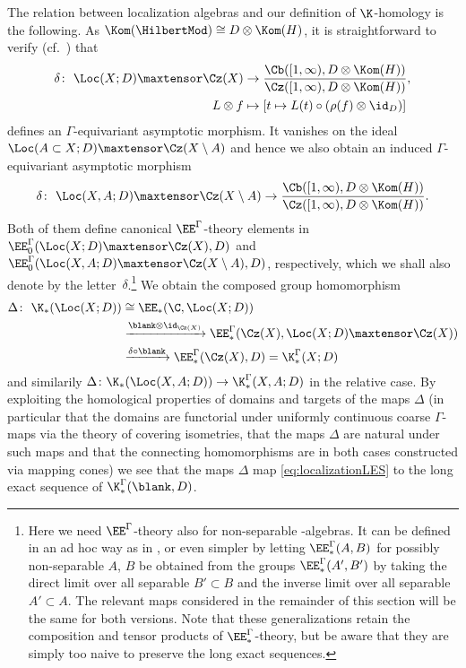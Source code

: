 The relation between localization algebras and our definition of $\K$-homology is the following. As $\Kom(\HilbertMod)\cong D\otimes\Kom(H)$, it is straightforward to verify (cf.\ \cite[Corollary~4.2]{QiaoRoe}) that
\begin{align*}
\delta\colon\ \Loc(X;D)\maxtensor\Cz(X) &\to\frac{\Cb([1,\infty),D\otimes \Kom(H))}{\Cz([1,\infty),D\otimes\Kom(H))},
\\
L\otimes f&\mapsto [t\mapsto L(t)\circ (\rho(f)\otimes\id_D)]
\end{align*}
defines an $\Gamma$-equivariant asymptotic morphism. It vanishes on the ideal $\Loc(A\subset X;D)\maxtensor\Cz(X\setminus A)$ and hence we also obtain an induced $\Gamma$-equivariant asymptotic morphism
\[
\delta\colon\ \Loc(X,A;D)\maxtensor\Cz(X\setminus A) \to\frac{\Cb([1,\infty),D\otimes \Kom(H))}{\Cz([1,\infty),D\otimes\Kom(H))}.
\]
Both of them define canonical $\EE^\Gamma$-theory elements in $\EE^\Gamma_0(\Loc(X;D)\maxtensor\Cz(X),D)$ and \linebreak $\EE^\Gamma_0(\Loc(X,A;D)\maxtensor\Cz(X\setminus A),D)$, respectively, which we shall also denote by the letter~$\delta$.\footnote{Here we need $\EE^\Gamma$-theory also for non-separable \textCstar-algebras. It can be defined in an ad hoc way as in \cite[Section~1]{WulffTwisted}, or even simpler by letting $\EE^\Gamma_*(A,B)$ for possibly non-separable $A$, $B$ be obtained from the groups $\EE^\Gamma_*(A',B')$ by taking the direct limit over all separable $B'\subset B$ and the inverse limit over all separable $A'\subset A$. The relevant maps considered in the remainder of this section will be the same for both versions.
Note that these generalizations retain the composition and tensor products of $\EE^\Gamma_*$-theory, but be aware that they are simply too naive to preserve the long exact sequences. }
We obtain the composed group homomorphism
\begin{align*}
\Delta\colon\ \K_*(\Loc(X;D))&\cong\EE_*(\C,\Loc(X;D))
\\&\xrightarrow{\blank\otimes\id_{\Cz(X)}}\EE^\Gamma_*(\Cz(X),\Loc(X;D)\maxtensor\Cz(X))
\\&\xrightarrow{\delta\circ\blank}\EE^\Gamma_*(\Cz(X),D)=\K^\Gamma_*(X;D)
\end{align*}
and similarily $\Delta\colon \K_*(\Loc(X,A;D))\to\K^\Gamma_*(X,A;D)$ in the relative case.
By exploiting the homological properties of domains and targets of the maps $\Delta$ (in particular that the domains are functorial under uniformly continuous coarse $\Gamma$-maps via the theory of covering isometries, that the maps $\Delta$ are natural under such maps and that the connecting homomorphisms are in both cases constructed via mapping cones) we see that the maps $\Delta$ map \eqref{eq:localizationLES} to the long exact sequence of $\K^\Gamma_*(\blank,D)$.

